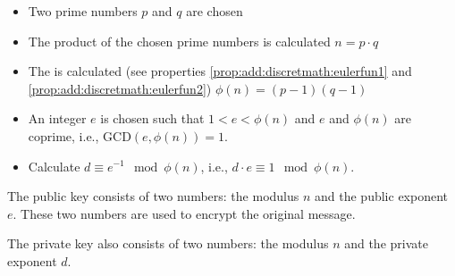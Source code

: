 \begin{itemize}
\item Two prime numbers $p$ and $q$ are chosen
\item The product of the chosen prime numbers is calculated $n = p\cdot q$
\item The  is calculated (see properties \ref{prop:add:discretmath:eulerfun1} and \ref{prop:add:discretmath:eulerfun2})
\(
\phi\left(n\right)=\left(p - 1 \right)\left(q - 1 \right)
\)
\item An integer $e$ is chosen such that 
\(
1 < e < \phi\left(n\right)
\) and $e$ and $\phi\left(n\right)$ are coprime, i.e., 
\(
\mbox{GCD}\left( e, \phi\left(n\right) \right) = 1.
\)
\item Calculate $d \equiv e^{-1} \mod{\phi\left(n\right)}$, i.e., $d \cdot e \equiv 1 \mod{\phi\left(n\right)}$.
\end{itemize}

The public key consists of two numbers: the modulus $n$ and the public exponent $e$. These two numbers are used to encrypt the original message.

The private key also consists of two numbers: the modulus $n$ and the private exponent $d$.